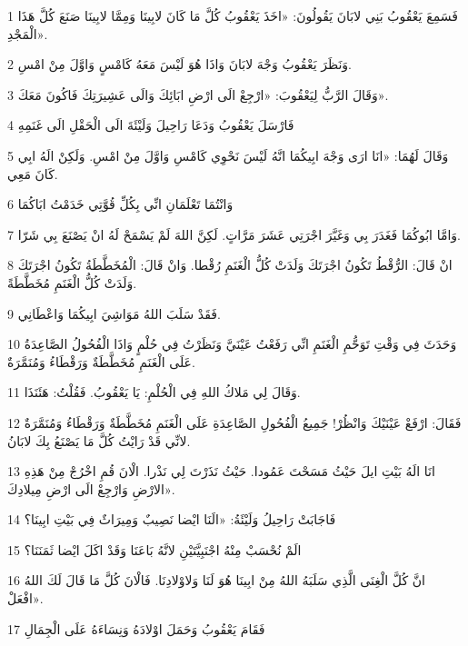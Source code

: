 \par 1 فَسَمِعَ يَعْقُوبُ بَنِي لابَانَ يَقُولُونَ: «اخَذَ يَعْقُوبُ كُلَّ مَا كَانَ لابِينَا وَمِمَّا لابِينَا صَنَعَ كُلَّ هَذَا الْمَجْدِ».
\par 2 وَنَظَرَ يَعْقُوبُ وَجْهَ لابَانَ وَاذَا هُوَ لَيْسَ مَعَهُ كَامْسٍ وَاوَّلَ مِنْ امْسِ.
\par 3 وَقَالَ الرَّبُّ لِيَعْقُوبَ: «ارْجِعْ الَى ارْضِ ابَائِكَ وَالَى عَشِيرَتِكَ فَاكُونَ مَعَكَ».
\par 4 فَارْسَلَ يَعْقُوبُ وَدَعَا رَاحِيلَ وَلَيْئَةَ الَى الْحَقْلِ الَى غَنَمِهِ
\par 5 وَقَالَ لَهُمَا: «انَا ارَى وَجْهَ ابِيكُمَا انَّهُ لَيْسَ نَحْوِي كَامْسِ وَاوَّلَ مِنْ امْسِ. وَلَكِنْ الَهُ ابِي كَانَ مَعِي.
\par 6 وَانْتُمَا تَعْلَمَانِ انِّي بِكُلِّ قُوَّتِي خَدَمْتُ ابَاكُمَا
\par 7 وَامَّا ابُوكُمَا فَغَدَرَ بِي وَغَيَّرَ اجْرَتِي عَشَرَ مَرَّاتٍ. لَكِنَّ اللهَ لَمْ يَسْمَحْ لَهُ انْ يَصْنَعَ بِي شَرّا.
\par 8 انْ قَالَ: الرُّقْطُ تَكُونُ اجْرَتَكَ وَلَدَتْ كُلُّ الْغَنَمِ رُقْطا. وَانْ قَالَ: الْمُخَطَّطَةُ تَكُونُ اجْرَتَكَ وَلَدَتْ كُلُّ الْغَنَمِ مُخَطَّطَةً.
\par 9 فَقَدْ سَلَبَ اللهُ مَوَاشِيَ ابِيكُمَا وَاعْطَانِي.
\par 10 وَحَدَثَ فِي وَقْتِ تَوَحُّمِ الْغَنَمِ انِّي رَفَعْتُ عَيْنَيَّ وَنَظَرْتُ فِي حُلْمٍ وَاذَا الْفُحُولُ الصَّاعِدَةُ عَلَى الْغَنَمِ مُخَطَّطَةٌ وَرَقْطَاءُ وَمُنَمَّرَةٌ.
\par 11 وَقَالَ لِي مَلاكُ اللهِ فِي الْحُلْمِ: يَا يَعْقُوبُ. فَقُلْتُ: هَئَنَذَا.
\par 12 فَقَالَ: ارْفَعْ عَيْنَيْكَ وَانْظُرْ! جَمِيعُ الْفُحُولِ الصَّاعِدَةِ عَلَى الْغَنَمِ مُخَطَّطَةٌ وَرَقْطَاءُ وَمُنَمَّرَةٌ لانِّي قَدْ رَايْتُ كُلَّ مَا يَصْنَعُ بِكَ لابَانُ.
\par 13 انَا الَهُ بَيْتِ ايلَ حَيْثُ مَسَحْتَ عَمُودا. حَيْثُ نَذَرْتَ لِي نَذْرا. الْانَ قُمِ اخْرُجْ مِنْ هَذِهِ الارْضِ وَارْجِعْ الَى ارْضِ مِيلادِكَ».
\par 14 فَاجَابَتْ رَاحِيلُ وَلَيْئَةُ: «الَنَا ايْضا نَصِيبٌ وَمِيرَاثٌ فِي بَيْتِ ابِينَا؟
\par 15 الَمْ نُحْسَبْ مِنْهُ اجْنَبِيَّتَيْنِ لانَّهُ بَاعَنَا وَقَدْ اكَلَ ايْضا ثَمَنَنَا؟
\par 16 انَّ كُلَّ الْغِنَى الَّذِي سَلَبَهُ اللهُ مِنْ ابِينَا هُوَ لَنَا وَلاوْلادِنَا. فَالْانَ كُلَّ مَا قَالَ لَكَ اللهُ افْعَلْ».
\par 17 فَقَامَ يَعْقُوبُ وَحَمَلَ اوْلادَهُ وَنِسَاءَهُ عَلَى الْجِمَالِ
